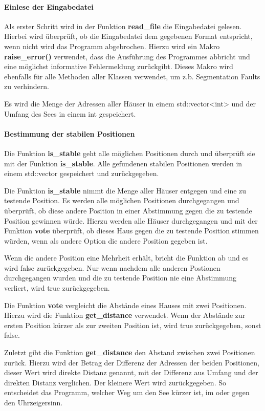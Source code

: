 \documentclass[a4paper,10pt,ngerman]{scrartcl}
\begin{document}
\paragraph{Einlese der Eingabedatei}
Als erster Schritt wird in der Funktion \textbf{read\_file} die Eingabedatei gelesen.
Hierbei wird überprüft, ob die Eingabedatei dem gegebenen Format entspricht, wenn nicht wird das Programm abgebrochen.
Hierzu wird ein Makro \textbf{raise\_error()} verwendet, dass die Ausführung des Programmes abbricht und eine möglichst informative Fehlermeldung zurückgibt.
Dieses Makro wird ebenfalls für alle Methoden aller Klassen verwendet, um z.b. Segmentation Faults zu verhindern.

Es wird die Menge der Adressen aller Häuser in einem std::vector<int> und der Umfang des Sees in einem int gespeichert.

\paragraph{Bestimmung der stabilen Positionen}
Die Funktion \textbf{is\_stable} geht alle möglichen Positionen durch und überprüft sie mit der Funktion \textbf{is\_stable}.
Alle gefundenen stabilen Positionen werden in einem std::vector gespeichert und zurückgegeben.

Die Funktion \textbf{is\_stable} nimmt die Menge aller Häuser entgegen und eine zu testende Position.
Es werden alle möglichen Positionen durchgegangen und überprüft, ob diese andere Position in einer Abstimmung gegen die zu testende Position gewinnen würde.
Hierzu werden alle Häuser durchgegangen und mit der Funktion \textbf{vote} überprüft, ob dieses Haus gegen die zu testende Position stimmen würden, wenn als andere Option die andere Position gegeben ist.

Wenn die andere Position eine Mehrheit erhält, bricht die Funktion ab und es wird false zurückgegeben.
Nur wenn nachdem alle anderen Postionen durchgegangen wurden und die zu testende Position nie eine Abstimmung verliert, wird true zurückgegeben.

Die Funktion \textbf{vote} vergleicht die Abstände eines Hauses mit zwei Positionen.
Hierzu wird die Funktion \textbf{get\_distance} verwendet.
Wenn der Abstände zur ersten Position kürzer als zur zweiten Position ist, wird true zurückgegeben, sonst false.

Zuletzt gibt die Funktion \textbf{get\_distance} den Abstand zwischen zwei Positionen zurück.
Hierzu wird der Betrag der Differenz der Adressen der beiden Positionen, dieser Wert wird direkte Distanz genannt, mit der Differenz aus Umfang und der direkten Distanz verglichen.
Der kleinere Wert wird zurückgegeben.
So entscheidet das Programm, welcher Weg um den See kürzer ist, im oder gegen den Uhrzeigersinn.
\end{document}
